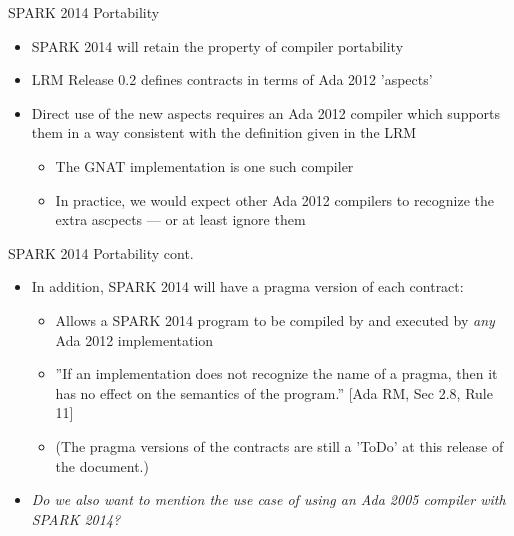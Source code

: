 \documentclass{beamer}
\begin{document}
\begin{frame}{SPARK 2014 Portability}

  \begin{itemize}
  \item SPARK 2014 will retain the property of compiler portability

  \item LRM Release 0.2 defines contracts in terms of Ada 2012 'aspects'

  \item Direct use of the new aspects requires an Ada 2012 compiler which supports them in a way consistent with the definition given in the LRM

    \begin{itemize}
    \item The GNAT implementation is one such compiler
    \item In practice, we would expect other Ada 2012 compilers to recognize the extra ascpects --- or at least ignore them
    \end{itemize}

\end{itemize}

\end{frame}

\begin{frame}{SPARK 2014 Portability cont.}

  \begin{itemize}
  \item In addition, SPARK 2014 will have a pragma version of each contract:

    \begin{itemize}
    \item Allows a SPARK 2014 program to be compiled by and executed by \emph{any} Ada 2012 implementation

    \item ''If an implementation does not recognize the name of a pragma, then it has no effect on the semantics of the program.'' [Ada RM, Sec 2.8, Rule 11]

    \item (The pragma versions of the contracts are still a 'ToDo' at this release of the document.)

    \end{itemize}

  \item \emph{Do we also want to mention the use case of using an Ada 2005 compiler with SPARK 2014?}
  
\end{itemize}

\end{frame}
\end{document}
